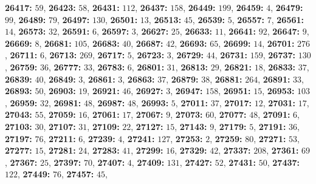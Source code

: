 \textsf{\bfseries 26417:} $59$, \textsf{\bfseries 26423:} $58$, \textsf{\bfseries 26431:} $112$, \textsf{\bfseries 26437:} $158$, \textsf{\bfseries 26449:} $199$, \textsf{\bfseries 26459:} $4$, \textsf{\bfseries 26479:} $99$, \textsf{\bfseries 26489:} $79$, \textsf{\bfseries 26497:} $130$, \textsf{\bfseries 26501:} $13$, \textsf{\bfseries 26513:} $45$, \textsf{\bfseries 26539:} $5$, \textsf{\bfseries 26557:} $7$, \textsf{\bfseries 26561:} $14$, \textsf{\bfseries 26573:} $32$, \textsf{\bfseries 26591:} $6$, \textsf{\bfseries 26597:} $3$, \textsf{\bfseries 26627:} $25$, \textsf{\bfseries 26633:} $11$, \textsf{\bfseries 26641:} $92$, \textsf{\bfseries 26647:} $9$, \textsf{\bfseries 26669:} $8$, \textsf{\bfseries 26681:} $105$, \textsf{\bfseries 26683:} $40$, \textsf{\bfseries 26687:} $42$, \textsf{\bfseries 26693:} $65$, \textsf{\bfseries 26699:} $14$, \textsf{\bfseries 26701:} $276$, \textsf{\bfseries 26711:} $6$, \textsf{\bfseries 26713:} $269$, \textsf{\bfseries 26717:} $5$, \textsf{\bfseries 26723:} $3$, \textsf{\bfseries 26729:} $44$, \textsf{\bfseries 26731:} $159$, \textsf{\bfseries 26737:} $130$, \textsf{\bfseries 26759:} $36$, \textsf{\bfseries 26777:} $33$, \textsf{\bfseries 26783:} $6$, \textsf{\bfseries 26801:} $31$, \textsf{\bfseries 26813:} $29$, \textsf{\bfseries 26821:} $18$, \textsf{\bfseries 26833:} $37$, \textsf{\bfseries 26839:} $40$, \textsf{\bfseries 26849:} $3$, \textsf{\bfseries 26861:} $3$, \textsf{\bfseries 26863:} $37$, \textsf{\bfseries 26879:} $38$, \textsf{\bfseries 26881:} $264$, \textsf{\bfseries 26891:} $33$, \textsf{\bfseries 26893:} $50$, \textsf{\bfseries 26903:} $19$, \textsf{\bfseries 26921:} $46$, \textsf{\bfseries 26927:} $3$, \textsf{\bfseries 26947:} $158$, \textsf{\bfseries 26951:} $15$, \textsf{\bfseries 26953:} $103$, \textsf{\bfseries 26959:} $32$, \textsf{\bfseries 26981:} $48$, \textsf{\bfseries 26987:} $48$, \textsf{\bfseries 26993:} $5$, \textsf{\bfseries 27011:} $37$, \textsf{\bfseries 27017:} $12$, \textsf{\bfseries 27031:} $17$, \textsf{\bfseries 27043:} $55$, \textsf{\bfseries 27059:} $16$, \textsf{\bfseries 27061:} $17$, \textsf{\bfseries 27067:} $9$, \textsf{\bfseries 27073:} $60$, \textsf{\bfseries 27077:} $48$, \textsf{\bfseries 27091:} $6$, \textsf{\bfseries 27103:} $30$, \textsf{\bfseries 27107:} $31$, \textsf{\bfseries 27109:} $22$, \textsf{\bfseries 27127:} $15$, \textsf{\bfseries 27143:} $9$, \textsf{\bfseries 27179:} $5$, \textsf{\bfseries 27191:} $36$, \textsf{\bfseries 27197:} $76$, \textsf{\bfseries 27211:} $6$, \textsf{\bfseries 27239:} $4$, \textsf{\bfseries 27241:} $127$, \textsf{\bfseries 27253:} $2$, \textsf{\bfseries 27259:} $80$, \textsf{\bfseries 27271:} $53$, \textsf{\bfseries 27277:} $15$, \textsf{\bfseries 27281:} $24$, \textsf{\bfseries 27283:} $41$, \textsf{\bfseries 27299:} $16$, \textsf{\bfseries 27329:} $42$, \textsf{\bfseries 27337:} $208$, \textsf{\bfseries 27361:} $69$, \textsf{\bfseries 27367:} $25$, \textsf{\bfseries 27397:} $70$, \textsf{\bfseries 27407:} $4$, \textsf{\bfseries 27409:} $131$, \textsf{\bfseries 27427:} $52$, \textsf{\bfseries 27431:} $50$, \textsf{\bfseries 27437:} $122$, \textsf{\bfseries 27449:} $76$, \textsf{\bfseries 27457:} $45$, 
